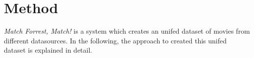 \section{Method}
\label{sec_method}

\emph{Match Forrest, Match!} is a system which creates an unifed dataset of movies from different datasources.
In the following, the approach to created this unifed dataset is explained in detail.






